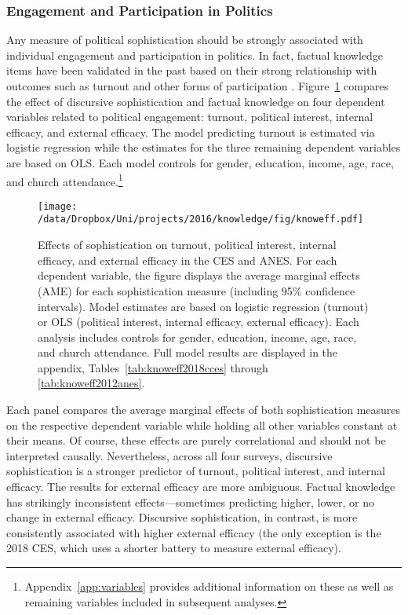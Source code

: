 \subsubsection*{Engagement and Participation in Politics}
Any measure of political sophistication should be strongly associated with individual engagement and participation in politics. In fact, factual knowledge items have been validated in the past based on their strong relationship with outcomes such as turnout and other forms of participation \citep[230--233]{lupia2015uninformed}. Figure~\ref{fig:knoweff} compares the effect of discursive sophistication and factual knowledge on four dependent variables related to political engagement: turnout, political interest, internal efficacy, and external efficacy. The model predicting turnout is estimated via logistic regression while the estimates for the three remaining dependent variables are based on OLS. Each model controls for gender, education, income, age, race, and church attendance.\footnote{Appendix~\ref{app:variables} provides additional information on these as well as remaining variables included in subsequent analyses.}

\begin{figure}[h]\centering
\texttt{[image: /data/Dropbox/Uni/projects/2016/knowledge/fig/knoweff.pdf]}
\caption[Effects of sophistication on turnout, political interest, internal efficacy, and external efficacy]{Effects of sophistication on turnout, political interest, internal efficacy, and external efficacy in the CES and ANES. For each dependent variable, the figure displays the average marginal effects (AME) for each sophistication measure (including 95\% confidence intervals). Model estimates are based on logistic regression (turnout) or OLS (political interest, internal efficacy, external efficacy). Each analysis includes controls for gender, education, income, age, race, and church attendance. Full model results are displayed in the appendix, Tables~\ref{tab:knoweff2018cces} through \ref{tab:knoweff2012anes}.}\label{fig:knoweff}
\end{figure}

Each panel compares the average marginal effects of both sophistication measures on the respective dependent variable while holding all other variables constant at their means. Of course, these effects are purely correlational and should not be interpreted causally. Nevertheless, across all four surveys, discursive sophistication is a stronger predictor of turnout, political interest, and internal efficacy. The results for external efficacy are more ambiguous. Factual knowledge has strikingly inconsistent effects---sometimes predicting higher, lower, or no change in external efficacy. Discursive sophistication, in contrast, is more consistently associated with higher external efficacy (the only exception is the 2018 CES, which uses a shorter battery to measure external efficacy).

